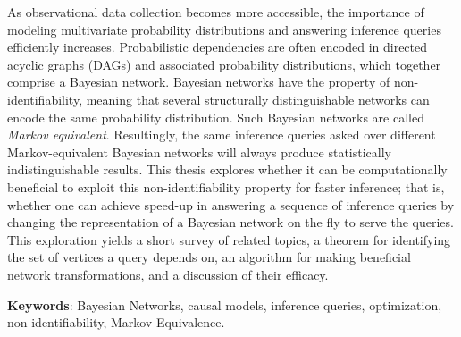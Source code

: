 {
\null\vspace{\fill}
{}
As observational data collection becomes more accessible, the importance of modeling multivariate probability distributions and answering inference queries efficiently increases. Probabilistic dependencies are often encoded in directed acyclic graphs (DAGs) and associated probability distributions, which together comprise a Bayesian network. Bayesian networks have the property of non-identifiability, meaning that several structurally distinguishable networks can encode the same probability distribution. Such Bayesian networks are called \textit{Markov equivalent}. Resultingly, the same inference queries asked over different Markov-equivalent Bayesian networks will always produce statistically indistinguishable results. This thesis explores whether it can be computationally beneficial to exploit this non-identifiability property for faster inference; that is, whether one can achieve speed-up in answering a sequence of inference queries by changing the representation of a Bayesian network on the fly to serve the queries. This exploration yields a short survey of related topics, a theorem for identifying the set of vertices a query depends on, an algorithm for making beneficial network transformations, and a discussion of their efficacy.  \newline 

\textbf{Keywords}: Bayesian Networks, causal models, inference queries, optimization, non-identifiability, Markov Equivalence.

\vspace{\fill}
}

